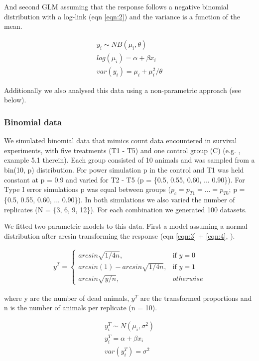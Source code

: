 \documentclass{scrartcl}\usepackage[]{graphicx}\usepackage[]{color}
\begin{document}
And second GLM assuming that the response follows a negative binomial distribution with a log-link (eqn \ref{eqn:2}) and
the variance is a function of the mean.

\begin{align}
  y_i \sim NB(\mu_i, \theta)  \nonumber \\
  log(\mu_i) = \alpha + \beta x_i   \label{eqn:2} \\
  var(y_i) = \mu_i + \mu_i^2 / \theta  \nonumber
\end{align}

Additionally we also analysed this data using a non-parametric approach (see below).

\subsubsection{Binomial data}
We simulated binomial data that mimics count data encountered in survival experiments, with five treatments (T1 - T5) and one control group (C) (e.g. \citep{newman_quantitative_2012}, example 5.1 therein).
Each group consisted of 10 animals and was sampled from a bin(10, p) distribution.
For power simulation p in the control and T1 was held constant at p = 0.9 and varied for T2 - T5  (p = \{0.5, 0.55, 0.60, ... 0.90\}).
For Type I error simulations p was equal between groups ($p_c = p_{T1} = ... = p_{T6}$; p = \{0.5, 0.55, 0.60, ... 0.90\}).
In both simulations we also varied the number of replicates (N = \{3, 6, 9, 12\}).
For each combination we generated 100 datasets.

We fitted two parametric models to this data.
First a model assuming a normal distribution after arcsin transforming the response (eqn \ref{eqn:3} + \ref{eqn:4}, \citep{epa_methods_2002}).

\begin{align}
  y^T = 
  \begin{cases}
    arcsin \sqrt{1/4n}, & \text{if } y = 0 \\
    arcsin(1) - arcsin \sqrt{1/4n}, & \text{if } y = 1 \\
    arcsin \sqrt{y / n}, & otherwise
  \end{cases}
  \label{eqn:3}
\end{align}

where y are the number of dead animals, $y^T$ are the transformed proportions and n is the number of animals per replicate (n = 10).

\begin{align}
  y^T_i \sim N(\mu_i, \sigma^2) \nonumber \\
  y^T_i = \alpha + \beta x_i \label{eqn:4} \\
  var(y^T_i) = \sigma^2 \nonumber
\end{align}
\end{document}
